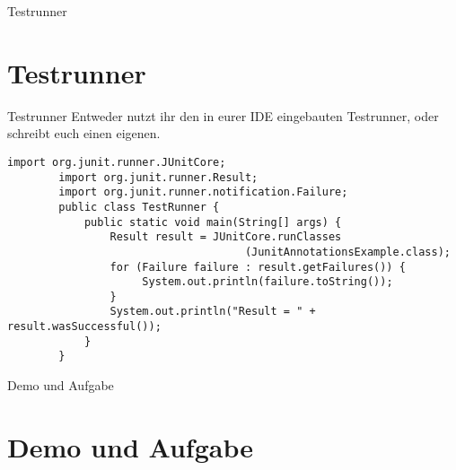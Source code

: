 \documentclass[10pt]{beamer}
\begin{document}
\begin{frame}[fragile]{Testrunner}
    \section{Testrunner}
\end{frame}

\begin{frame}[fragile]{Testrunner}
    Entweder nutzt ihr den in eurer IDE eingebauten Testrunner, \newline
    oder schreibt euch einen eigenen.

    \begin{lstlisting}[basicstyle=\ttfamily\scriptsize,gobble=8]
        import org.junit.runner.JUnitCore;
        import org.junit.runner.Result;	
        import org.junit.runner.notification.Failure;
        public class TestRunner {
            public static void main(String[] args) {
                Result result = JUnitCore.runClasses
                                     (JunitAnnotationsExample.class);
                for (Failure failure : result.getFailures()) {
                     System.out.println(failure.toString());
                }
                System.out.println("Result = " + result.wasSuccessful());
            }		
        }      	
    \end{lstlisting}
\end{frame}

\begin{frame}[fragile]{Demo und Aufgabe}
    \section{Demo und Aufgabe}
\end{frame}
\end{document}
